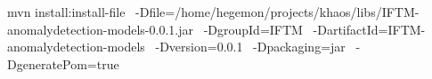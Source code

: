 mvn install:install-file  \
    -Dfile=/home/hegemon/projects/khaos/libs/IFTM-anomalydetection-models-0.0.1.jar \
    -DgroupId=IFTM \
    -DartifactId=IFTM-anomalydetection-models \
    -Dversion=0.0.1 \
    -Dpackaging=jar \
    -DgeneratePom=true